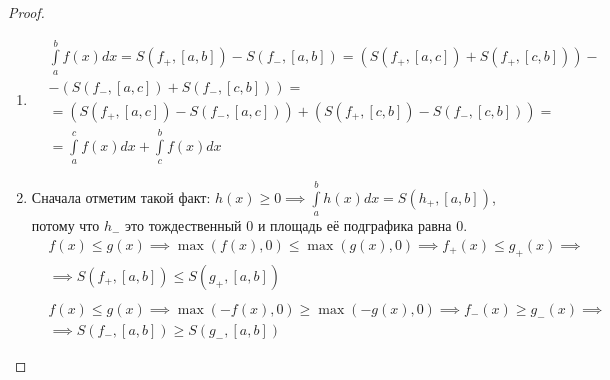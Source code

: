 \documentclass[../main.tex]{subfiles}
\begin{document}
\begin{proof}
    
    ~

    \begin{enumerate}
        \item \begin{equation*}
            \begin{aligned}
                &\displaystyle\int\limits_{ a}^{ b} f\left( x\right)dx=S\left( f_+, \left[ a,b\right]\right)-S\left( f_-, \left[ a,b\right]\right)=\left( S\left( f_+, \left[ a,c\right]\right)+S\left( f_+, \left[ c,b\right]\right)\right)-\\
                &-\left( S\left( f_-,\left[ a,c\right]\right)+S\left( f_-, \left[ c,b\right]\right)\right)=\\ 
                &=\left( S\left( f_+, \left[ a,c\right]\right)-S\left( f_-,\left[ a,c\right]\right)\right)+\left( S\left( f_+, \left[ c,b\right]\right)-S\left( f_-, \left[ c,b\right]\right)\right)= \\
                &=\displaystyle\int\limits_{ a}^{ c} f\left( x\right)dx+ \displaystyle\int\limits_{ c}^{ b} f\left( x\right)dx
            \end{aligned}
        \end{equation*}
        \item Сначала отметим такой факт: \( h\left( x\right) \geq 0 \implies \displaystyle\int\limits_{ a}^{ b} h\left( x\right)dx=S\left( h_+, \left[ a,b\right]\right)\), потому что \( h_-\) это тождественный 0 и площадь её подграфика равна 0. 
        \begin{equation*}
            \begin{aligned}
                &f\left( x\right) \leq g \left( x\right) \implies \max\limits_{ } \left( f\left( x\right),0\right) \leq \max\limits_{ } \left( g \left( x\right),0\right) \implies f_+\left( x\right) \leq g_+ \left( x\right) \implies \\
                & \implies S\left( f_+, \left[ a,b\right]\right) \leq S\left( g_+, \left[ a,b\right]\right)\\ \\
                & f\left( x\right) \leq g \left( x\right) \implies \max\limits_{ } \left( -f\left( x\right),0\right) \geq \max\limits_{ } \left( -g \left( x\right),0\right) \implies f_-\left( x\right) \geq g_- \left( x\right) \implies \\
                & \implies S\left( f_-, \left[ a,b\right]\right) \geq S\left( g_-, \left[ a,b\right]\right)
            \end{aligned}

\end{equation*}
\end{enumerate}
\end{proof}
\end{document}
